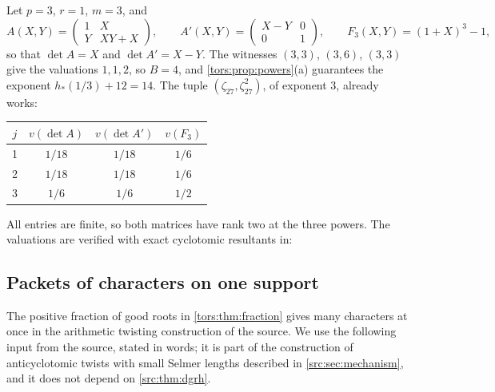 \begin{example}\label{tors:ex:rank}
Let $p=3$, $r=1$, $m=3$, and
\[
  A(X,Y)=\begin{pmatrix}1&X\\ Y&XY+X\end{pmatrix},\qquad
  A'(X,Y)=\begin{pmatrix}X-Y&0\\ 0&1\end{pmatrix},\qquad F_3(X,Y)=(1+X)^3-1 ,
\]
so that $\det A=X$ and $\det A'=X-Y$. The witnesses $(3,3)$, $(3,6)$, $(3,3)$ give the
valuations $1,1,2$, so $B=4$, and \cref{tors:prop:powers}(a) guarantees the exponent
$h_*(1/3)+12=14$. The tuple $(\zeta_{27},\zeta_{27}^2)$, of exponent $3$, already works:
\begin{center}
\begin{tabular}{cccc}
\toprule
$j$ & $v(\det A)$ & $v(\det A')$ & $v(F_3)$\\
\midrule
1 & $1/18$ & $1/18$ & $1/6$\\
2 & $1/18$ & $1/18$ & $1/6$\\
3 & $1/6$ & $1/6$ & $1/2$\\
\bottomrule
\end{tabular}
\end{center}
All entries are finite, so both matrices have rank two at the three powers. The
valuations are verified with exact cyclotomic resultants in:
\end{example}

\subsection{Packets of characters on one support}\label{tors:sec:characters}

The positive fraction of good roots in \cref{tors:thm:fraction} gives many characters at
once in the arithmetic twisting construction of the source. We use the following input
from the source, stated in words; it is part of the construction of anticyclotomic twists
with small Selmer lengths described in \cref{src:sec:mechanism}, and it does not depend
on \cref{src:thm:dgrh}.

